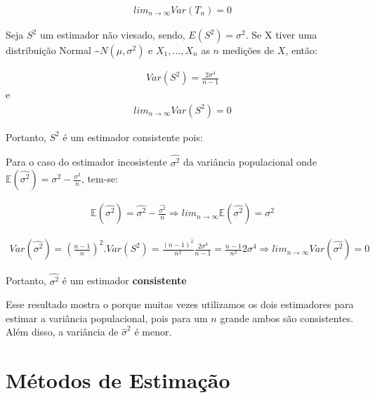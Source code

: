 \documentclass[
  letterpaper,
  DIV=11,
  numbers=noendperiod]{scrartcl}
\begin{document}
\[\begin{array}{ccc}
lim_{n \rightarrow \infty} Var (T_n) = 0
\end{array}\]

\begin{exemplo}

Seja \(S^{2}\) um estimador não viesado, sendo, \(E(S^{2})=\sigma^{2}\).
Se X tiver uma distribuição Normal
\textasciitilde{}\(N(\mu,\sigma^{2})\) e \(X_1, ..., X_n\) as \(n\)
medições de \(X\), então:

\[\begin{array}{ccc}
Var(S^{2})=\frac{2 \sigma^{4}}{n-1}
\end{array}\] e \[\begin{array}{ccc}
lim_{n \rightarrow \infty}Var(S^{2})=0
\end{array}\]

Portanto, \(S^{2}\) é um estimador consistente pois:

\end{exemplo}

\begin{exemplo}

Para o caso do estimador incosistente \(\hat{\sigma^2}\) da variância
populacional onde
\(\mathbb{E}(\hat{\sigma^2})=\sigma^2-\frac{\sigma^2}{n}\), tem-se:

\[\begin{array}{ccc}
\mathbb{E}(\hat{\sigma^{2}})=\hat{\sigma^{2}}- \frac{\hat{\sigma^{2}}}{n} \Rightarrow lim_{n \rightarrow \infty} \mathbb{E}(\hat{\sigma^{2}})={\sigma^{2}}
\end{array}\]

\[\begin{array}{ccc}
Var(\hat{\sigma^{2}})= (\frac{n-1}{n})^{2}. Var(S^{2}) = \frac{(n-1)^2}{n^{2}} \frac{2\sigma^{4}}{n-1}=\frac{n-1}{n^{2}} 2 \sigma^{4} \Rightarrow lim_{n \rightarrow \infty} Var(\hat{\sigma^{2}})=0
\end{array}\]

Portanto, \(\hat{\sigma^{2}}\) é um estimador \textbf{consistente}

\end{exemplo}

Esse resultado mostra o porque muitas vezes utilizamos os dois
estimadores para estimar a variância populacional, pois para um \(n\)
grande ambos são consistentes. Além disso, a variância de
\(\hat{\sigma}^2\) é menor.

\section{Métodos de Estimação}\label{muxe9todos-de-estimauxe7uxe3o}
\end{document}
